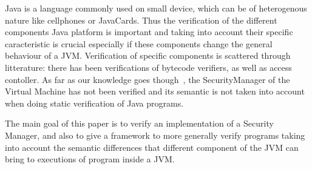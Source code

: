 Java is a language commonly used on small device, which can be of
heterogenous nature like cellphones or JavaCards. Thus the
verification of the different components Java platform is important
and taking into account their specific caracteristic is crucial
especially if these components change the general behaviour of a
JVM. Verification of specific components is scattered through
litterature: there has been verifications of bytecode verifiers, as
well as access contoller. As far as our knowledge goes
though~\cite{HartelMoreau01}, the SecurityManager of the Virtual
Machine has not been verified and its semantic is not taken into
account when doing static verification of Java programs.


The main goal of this paper is to verify an implementation of a
Security Manager, and also to give a framework to more generally verify
programs taking into account the semantic differences that different
component of the JVM can bring to executions of program inside 
a JVM.


